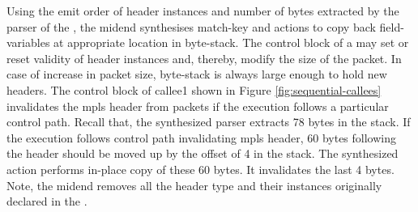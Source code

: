 \documentclass[letterpaper,twocolumn,10pt]{article}
\begin{document}



Using the emit order of header instances and 
number of bytes extracted by the parser of the \uprogram, the midend 
synthesises match-key and actions to copy back field-variables at 
appropriate location in byte-stack.
The control block of a \uprogram may set or reset validity of 
header instances and, thereby, modify the size of the packet. In case 
of increase in packet size, byte-stack is always large enough to hold 
new headers. The control block of callee1 shown in Figure 
\ref{fig:sequential-callees} invalidates the mpls header from packets 
if the execution follows a particular control path.
Recall that, the synthesized parser extracts 78 bytes in the 
stack. If the execution follows control path invalidating mpls 
header, 60 bytes following the header should be moved up by the offset 
of 4 in the stack. The synthesized action performs in-place copy of 
these 60 bytes. It invalidates the last 4 bytes. 
Note, the midend removes all the header type and their instances 
originally declared in the \uprogram.
\end{document}
